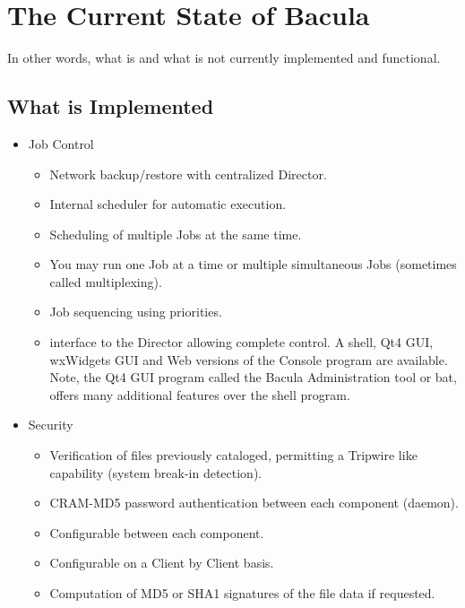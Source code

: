 
\chapter{The Current State of Bacula}
\label{StateChapter}

In other words, what is and what is not currently implemented and functional. 

\section{What is Implemented}

\begin{itemize}
\item Job Control
   \begin{itemize}
   \item Network backup/restore with centralized Director.  
   \item Internal scheduler for automatic 
       execution.  
   \item Scheduling of multiple Jobs at the same time.  
   \item You may run one Job at a time or multiple simultaneous Jobs
         (sometimes called multiplexing).
   \item Job sequencing using priorities.  
   \item {} interface to the Director allowing complete
      control.  A shell, Qt4 GUI, wxWidgets GUI and Web versions of
      the Console program are available.  Note, the Qt4 GUI program called
      the Bacula Administration tool or bat, offers many additional
      features over the shell program.
   \end{itemize}

\item Security
   \begin{itemize}
   \item Verification of files previously cataloged, permitting a Tripwire like 
      capability (system break-in detection).  
   \item CRAM-MD5 password authentication between each component (daemon).
   \item Configurable 
       between each 
            component.
   \item Configurable
      on a Client by Client basis.
   \item Computation of MD5 or SHA1 signatures of the file data if requested.  
   \end{itemize}



\end{itemize}
